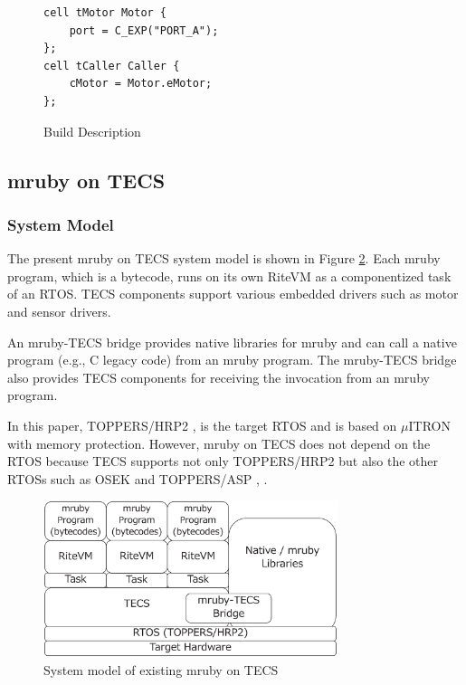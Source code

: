 \documentclass{sig-alternate-05-2015}
\begin{document}
\begin{description}
\begin{figure}[t]
\centering
\begin{lstlisting}
cell tMotor Motor {
    port = C_EXP("PORT_A");
};
cell tCaller Caller {
    cMotor = Motor.eMotor;
};
\end{lstlisting}
\vspace{1mm}
\caption{Build Description}
\vspace{1mm}
\label{build}
\end{figure}

\end{description}

\subsection{mruby on TECS}
\label{sec:mruby on TECS}

\subsubsection{System Model}
The present mruby on TECS system model is shown in Figure \ref{fig:mrubyontecs}.
Each mruby program, which is a bytecode, runs on its own RiteVM as a componentized task of an RTOS.
TECS components support various embedded drivers such as motor and sensor drivers.

An mruby-TECS bridge provides native libraries for mruby and can call a native program (e.g., C legacy code) from an mruby program.
The mruby-TECS bridge also provides TECS components for receiving the invocation from an mruby program.

In this paper, TOPPERS/HRP2 \cite{url:HRP2}, \cite{par:hr-tecs} is the target RTOS and is based on $\mu$ITRON \cite{par:microITRON} with memory protection.
However, mruby on TECS does not depend on the RTOS because TECS supports not only TOPPERS/HRP2 but also the other RTOSs such as OSEK \cite{par:OSEK} and TOPPERS/ASP \cite{par:ASP}, \cite{url:ASP}.

\begin{figure}[t]
    \centering
    \includegraphics[width=8.6cm,clip]{figure/mrubyontecs.eps}
    \vspace{0.5mm}
\caption{System model of existing mruby on TECS}
    \vspace{1mm}
\label{fig:mrubyontecs}
\end{figure}
\end{document}
